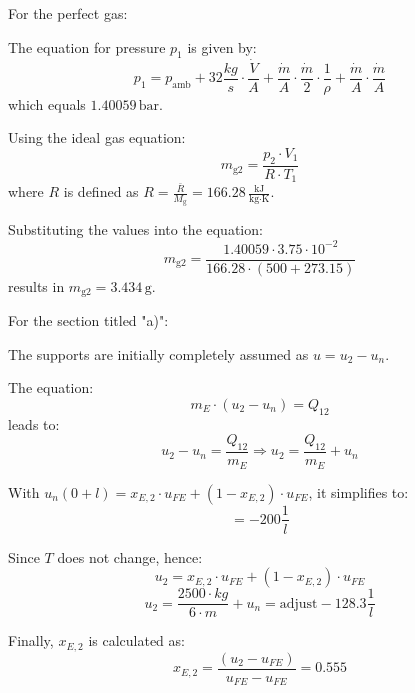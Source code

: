 For the perfect gas:

The equation for pressure \( p_1 \) is given by:
\[ p_1 = p_{\text{amb}} + 32 \frac{kg}{s} \cdot \frac{\dot{V}}{A} + \frac{\dot{m}}{A} \cdot \frac{\dot{m}}{2} \cdot \frac{1}{\rho} + \frac{\dot{m}}{A} \cdot \frac{\dot{m}}{A} \]
which equals \( 1.40059 \, \text{bar} \).

Using the ideal gas equation:
\[ m_{\text{g2}} = \frac{p_2 \cdot V_1}{R \cdot T_1} \]
where \( R \) is defined as \( R = \frac{\bar{R}}{M_{\text{g}}} = 166.28 \, \frac{\text{kJ}}{\text{kg} \cdot \text{K}} \).

Substituting the values into the equation:
\[ m_{\text{g2}} = \frac{1.40059 \cdot 3.75 \cdot 10^{-2}}{166.28 \cdot (500 + 273.15)} \]
results in \( m_{\text{g2}} = 3.434 \, \text{g} \).

For the section titled "a)":

The supports are initially completely assumed as \( u = u_{2} - u_{n} \).

The equation:
\[ m_E \cdot (u_2 - u_n) = Q_{12} \]
leads to:
\[ u_2 - u_n = \frac{Q_{12}}{m_E} \Rightarrow u_2 = \frac{Q_{12}}{m_E} + u_n \]

With \( u_n \left(0 + l\right) = x_{E,2} \cdot u_{FE} + (1 - x_{E,2}) \cdot u_{FE} \),
it simplifies to:
\[ = -200 \frac{1}{l} \]

Since \( T \) does not change, hence:
\[ u_2 = x_{E,2} \cdot u_{FE} + (1 - x_{E,2}) \cdot u_{FE} \]
\[ u_2 = \frac{2500 \cdot kg}{6 \cdot m} + u_n = \text{adjust} - 128.3 \frac{1}{l} \]

Finally, \( x_{E,2} \) is calculated as:
\[ x_{E,2} = \frac{(u_2 - u_{FE})}{u_{FE} - u_{FE}} = 0.555 \]